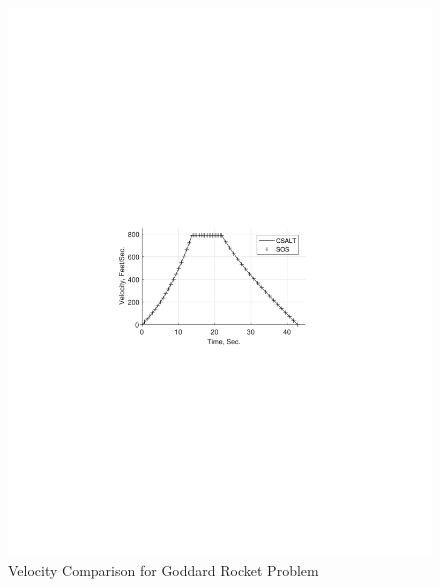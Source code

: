 \documentclass[ISTS  ]{tjsass} %
\begin{document}
\begin{figure}
    \centering
    \includegraphics[width=\columnwidth]{../Figures/GoddardRocket_VelocityVsTime}
    \caption{Velocity Comparison for Goddard Rocket Problem}
    \label{fig:goddard_vel}
\end{figure}
%
\end{document}
